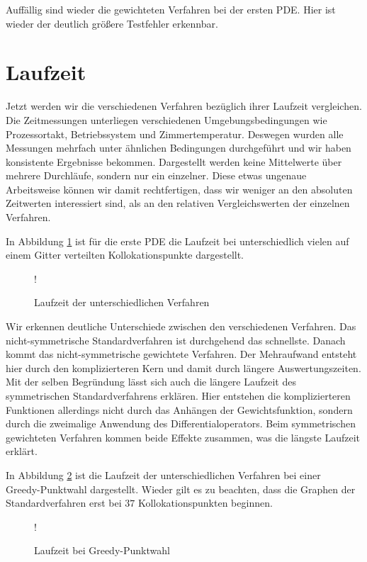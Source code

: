 Auffällig sind wieder die gewichteten Verfahren bei der ersten \ac{PDE}. Hier ist wieder der deutlich größere Testfehler erkennbar.

\section{Laufzeit}
Jetzt werden wir die verschiedenen Verfahren bezüglich ihrer Laufzeit vergleichen. Die Zeitmessungen unterliegen verschiedenen Umgebungsbedingungen wie Prozessortakt, Betriebssystem und Zimmertemperatur. Deswegen wurden alle Messungen mehrfach unter ähnlichen Bedingungen durchgeführt und wir haben konsistente Ergebnisse bekommen. Dargestellt werden keine Mittelwerte über mehrere Durchläufe, sondern nur ein einzelner. Diese etwas ungenaue Arbeitsweise können wir damit rechtfertigen, dass wir weniger an den absoluten Zeitwerten interessiert sind, als an den relativen Vergleichswerten der einzelnen Verfahren.

In Abbildung \ref{fig:Laufzeit} ist für die erste \ac{PDE} die Laufzeit bei unterschiedlich vielen auf einem Gitter verteilten Kollokationspunkte dargestellt.
\begin{figure}[ht]
\centering
\resizebox {\columnwidth} {!} {

}
\caption{Laufzeit der unterschiedlichen Verfahren}
\label{fig:Laufzeit}
\end{figure}

Wir erkennen deutliche Unterschiede zwischen den verschiedenen Verfahren. Das nicht-symmetrische Standardverfahren ist durchgehend das schnellste. Danach kommt das nicht-symmetrische gewichtete Verfahren. Der Mehraufwand entsteht hier durch den komplizierteren Kern und damit durch längere Auswertungszeiten. Mit der selben Begründung lässt sich auch die längere Laufzeit des symmetrischen Standardverfahrens erklären. Hier entstehen die komplizierteren Funktionen allerdings nicht durch das Anhängen der Gewichtsfunktion, sondern durch die zweimalige Anwendung des Differentialoperators. Beim symmetrischen gewichteten Verfahren kommen beide Effekte zusammen, was die längste Laufzeit erklärt.

In Abbildung \ref{fig:Laufzeit-greedy} ist die Laufzeit der unterschiedlichen Verfahren bei einer \\Greedy-Punktwahl dargestellt. Wieder gilt es zu beachten, dass die Graphen der Standardverfahren erst bei $37$ Kollokationspunkten beginnen.
\begin{figure}[ht]
\centering
\resizebox {\columnwidth} {!} {

}
\caption{Laufzeit bei Greedy-Punktwahl}
\label{fig:Laufzeit-greedy}
\end{figure}

